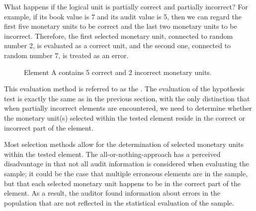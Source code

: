 What happens if the logical unit is partially correct and partially incorrect? For example, if its book value is 7 and its audit value is 5, then we can regard the first five monetary units to be correct and the last two monetary units to be incorrect. Therefore, the first selected monetary unit, connected to random number 2, is evaluated as a correct unit, and the second one, connected to random number 7, is treated as an error.


\begin{figure}[bthp]

\begin{center}
\caption{Element A contains 5 correct  and 2 incorrect monetary units.}
\label{fig:Partially_correct_item}

\end{center}
\end{figure}

This evaluation method is referred to as the . 
The evaluation of the hypothesis test is exactly the same as in the previous section, with the only distinction that when partially incorrect elements are encountered, we need to determine whether the monetary unit(s) selected within the tested element reside in the correct or incorrect part of the element.

\bigskip
Most selection methods allow for the determination of selected monetary units within the tested element. The all-or-nothing-approach has a perceived disadvantage in that not all audit information is considered when evaluating the sample; it could be the case that multiple erroneous elements are in the sample, but that each selected monetary unit happens to be in the correct part of the element. As a result, the auditor found information about errors in the population that are not reflected in the statistical evaluation of the sample.

